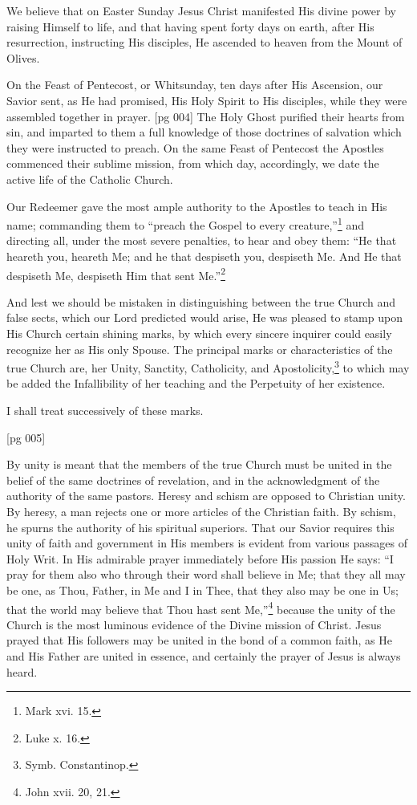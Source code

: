 We believe that on Easter Sunday Jesus Christ
manifested His divine power by raising Himself to
life, and that having spent forty days on earth,
after His resurrection, instructing His disciples,
He ascended to heaven from the Mount of Olives.

On the Feast of Pentecost, or Whitsunday, ten
days after His Ascension, our Savior sent, as He
had promised, His Holy Spirit to His disciples,
while they were assembled together in prayer.
[pg 004]
The Holy Ghost purified their hearts from sin, and
imparted to them a full knowledge of those doctrines
of salvation which they were instructed to
preach. On the same Feast of Pentecost the
Apostles commenced their sublime mission, from
which day, accordingly, we date the active life of
the Catholic Church.

Our Redeemer gave the most ample authority
to the Apostles to teach in His name; commanding
them to “preach the Gospel to every creature,”\footnote{Mark
xvi. 15.}
and directing all, under the most severe penalties,
to hear and obey them: “He that heareth you,
heareth Me; and he that despiseth you, despiseth
Me. And He that despiseth Me, despiseth Him
that sent Me.”\footnote{Luke x. 16.}

And lest we should be mistaken in distinguishing
between the true Church and false sects, which
our Lord predicted would arise, He was pleased
to stamp upon His Church certain shining marks,
by which every sincere inquirer could easily
recognize her as His only Spouse. The principal
marks or characteristics of the true Church are,
her Unity, Sanctity, Catholicity, and Apostolicity,\footnote{Symb.
Constantinop.}
to which may be added the Infallibility of her
teaching and the Perpetuity of her existence.

I shall treat successively of these marks.

[pg 005]


By unity is meant that the members of the true
Church must be united in the belief of the
same doctrines of revelation, and in the acknowledgment
of the authority of the same pastors.
Heresy and schism are opposed to Christian
unity. By heresy, a man rejects one or more articles
of the Christian faith. By schism, he spurns
the authority of his spiritual superiors. That our
Savior requires this unity of faith and government
in His members is evident from various
passages of Holy Writ. In His admirable prayer
immediately before His passion He says: “I pray
for them also who through their word shall believe
in Me; that they all may be one, as Thou,
Father, in Me and I in Thee, that they also may be
one in Us; that the world may believe that Thou
hast sent Me,”\footnote{John xvii.
20, 21.} because the unity of the Church
is the most luminous evidence of the Divine mission
of Christ. Jesus prayed that His followers
may be united in the bond of a common faith, as
He and His Father are united in essence, and certainly
the prayer of Jesus is always heard.

